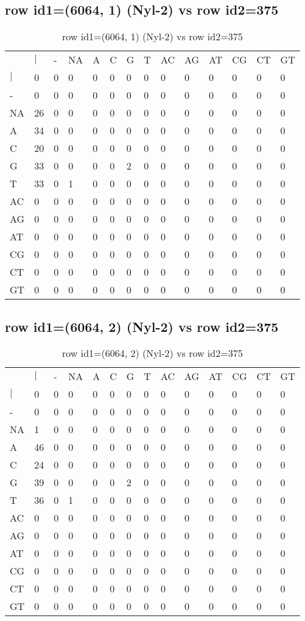 \subsection{row id1=(6064, 1) (Nyl-2) vs row id2=375}
\begin{center}
\begin{longtable}{|l|l|l|l|l|l|l|l|l|l|l|l|l|l|}
\caption{row id1=(6064, 1) (Nyl-2) vs row id2=375} \label{table_dm42}\\
\hline
\\
\hline
&$|$&-&NA&A&C&G&T&AC&AG&AT&CG&CT&GT\\
$|$&0&0&0&0&0&0&0&0&0&0&0&0&0\\
-&0&0&0&0&0&0&0&0&0&0&0&0&0\\
NA&26&0&0&0&0&0&0&0&0&0&0&0&0\\
A&34&0&0&0&0&0&0&0&0&0&0&0&0\\
C&20&0&0&0&0&0&0&0&0&0&0&0&0\\
G&33&0&0&0&0&2&0&0&0&0&0&0&0\\
T&33&0&1&0&0&0&0&0&0&0&0&0&0\\
AC&0&0&0&0&0&0&0&0&0&0&0&0&0\\
AG&0&0&0&0&0&0&0&0&0&0&0&0&0\\
AT&0&0&0&0&0&0&0&0&0&0&0&0&0\\
CG&0&0&0&0&0&0&0&0&0&0&0&0&0\\
CT&0&0&0&0&0&0&0&0&0&0&0&0&0\\
GT&0&0&0&0&0&0&0&0&0&0&0&0&0\\
\hline
\end{longtable}
\end{center}

\subsection{row id1=(6064, 2) (Nyl-2) vs row id2=375}
\begin{center}
\begin{longtable}{|l|l|l|l|l|l|l|l|l|l|l|l|l|l|}
\caption{row id1=(6064, 2) (Nyl-2) vs row id2=375} \label{table_dm44}\\
\hline
\\
\hline
&$|$&-&NA&A&C&G&T&AC&AG&AT&CG&CT&GT\\
$|$&0&0&0&0&0&0&0&0&0&0&0&0&0\\
-&0&0&0&0&0&0&0&0&0&0&0&0&0\\
NA&1&0&0&0&0&0&0&0&0&0&0&0&0\\
A&46&0&0&0&0&0&0&0&0&0&0&0&0\\
C&24&0&0&0&0&0&0&0&0&0&0&0&0\\
G&39&0&0&0&0&2&0&0&0&0&0&0&0\\
T&36&0&1&0&0&0&0&0&0&0&0&0&0\\
AC&0&0&0&0&0&0&0&0&0&0&0&0&0\\
AG&0&0&0&0&0&0&0&0&0&0&0&0&0\\
AT&0&0&0&0&0&0&0&0&0&0&0&0&0\\
CG&0&0&0&0&0&0&0&0&0&0&0&0&0\\
CT&0&0&0&0&0&0&0&0&0&0&0&0&0\\
GT&0&0&0&0&0&0&0&0&0&0&0&0&0\\
\hline
\end{longtable}
\end{center}

